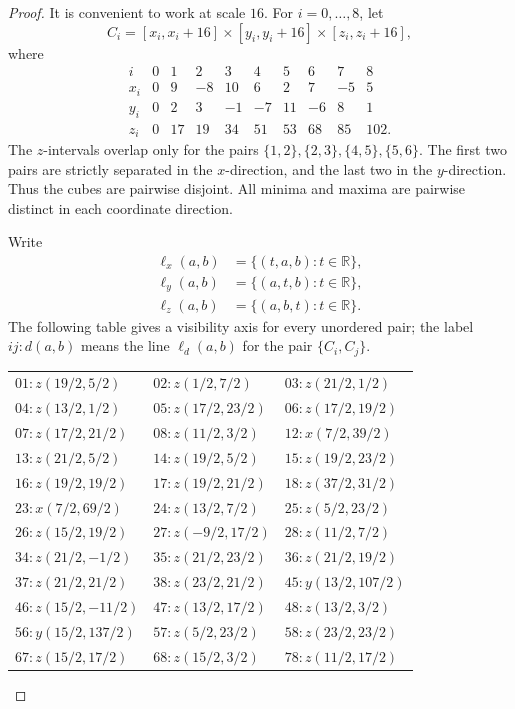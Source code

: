 \documentclass[11pt]{amsart}
\begin{document}
\begin{proof}
It is convenient to work at scale $16$. For $i=0,\ldots,8$, let
\[
 C_i
 =
 [x_i,x_i+16]
 \times
 [y_i,y_i+16]
 \times
 [z_i,z_i+16],
\]
where
\begin{equation}\label{eq:coordinates}
\begin{array}{c|rrrrrrrrr}
 i   &0&1&2&3&4&5&6&7&8\\ \hline
 x_i &0&9&-8&10&6&2&7&-5&5\\
 y_i &0&2&3&-1&-7&11&-6&8&1\\
 z_i &0&17&19&34&51&53&68&85&102.
\end{array}
\end{equation}
The $z$-intervals overlap only for the pairs
$\{1,2\},\{2,3\},\{4,5\},\{5,6\}$. The first two pairs are strictly
separated in the $x$-direction, and the last two in the $y$-direction.
Thus the cubes are pairwise disjoint. All minima and maxima are
pairwise distinct in each coordinate direction.

Write
\[
\begin{aligned}
 \ell_x(a,b)&=\{(t,a,b):t\in\mathbb R\},\\
 \ell_y(a,b)&=\{(a,t,b):t\in\mathbb R\},\\
 \ell_z(a,b)&=\{(a,b,t):t\in\mathbb R\}.
\end{aligned}
\]
The following table gives a visibility axis for every unordered pair;
the label $ij:d(a,b)$ means the line $\ell_d(a,b)$ for the pair
$\{C_i,C_j\}$.

\begin{center}
\footnotesize
\renewcommand{\arraystretch}{1.12}
\setlength{\tabcolsep}{7pt}
\begin{tabular}{lll}
\toprule
$01:z(19/2,5/2)$
&
$02:z(1/2,7/2)$
&
$03:z(21/2,1/2)$
\\
$04:z(13/2,1/2)$
&
$05:z(17/2,23/2)$
&
$06:z(17/2,19/2)$
\\
$07:z(17/2,21/2)$
&
$08:z(11/2,3/2)$
&
$12:x(7/2,39/2)$
\\
$13:z(21/2,5/2)$
&
$14:z(19/2,5/2)$
&
$15:z(19/2,23/2)$
\\
$16:z(19/2,19/2)$
&
$17:z(19/2,21/2)$
&
$18:z(37/2,31/2)$
\\
$23:x(7/2,69/2)$
&
$24:z(13/2,7/2)$
&
$25:z(5/2,23/2)$
\\
$26:z(15/2,19/2)$
&
$27:z(-9/2,17/2)$
&
$28:z(11/2,7/2)$
\\
$34:z(21/2,-1/2)$
&
$35:z(21/2,23/2)$
&
$36:z(21/2,19/2)$
\\
$37:z(21/2,21/2)$
&
$38:z(23/2,21/2)$
&
$45:y(13/2,107/2)$
\\
$46:z(15/2,-11/2)$
&
$47:z(13/2,17/2)$
&
$48:z(13/2,3/2)$
\\
$56:y(15/2,137/2)$
&
$57:z(5/2,23/2)$
&
$58:z(23/2,23/2)$
\\
$67:z(15/2,17/2)$
&
$68:z(15/2,3/2)$
&
$78:z(11/2,17/2)$
\\
\bottomrule
\end{tabular}
\end{center}


\end{proof}
\end{document}

